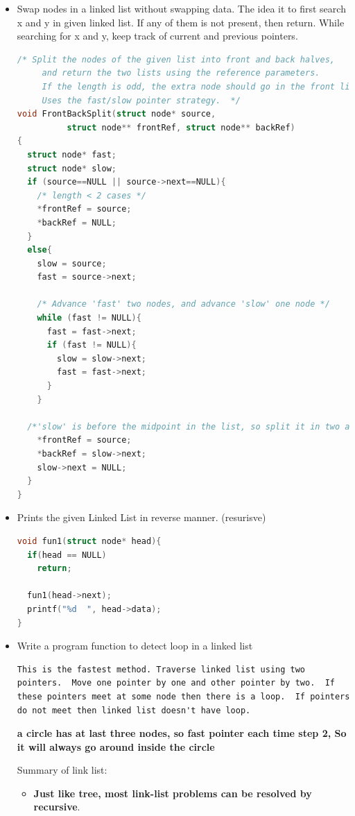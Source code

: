 \documentclass[a4paper,11pt,twoside]{book}
\begin{document}
\begin{itemize}
	\item Swap nodes in a linked list without swapping data. The idea it to first search x and y in given linked list. If any of them is not present, then return. While searching for x and y, keep track of current and previous pointers.
\begin{lstlisting}[frame=single, language=c++] 
/* Split the nodes of the given list into front and back halves,
     and return the two lists using the reference parameters.
     If the length is odd, the extra node should go in the front list.
     Uses the fast/slow pointer strategy.  */
void FrontBackSplit(struct node* source,
          struct node** frontRef, struct node** backRef)
{
  struct node* fast;
  struct node* slow;
  if (source==NULL || source->next==NULL){
    /* length < 2 cases */
    *frontRef = source;
    *backRef = NULL;
  }
  else{
    slow = source;
    fast = source->next;
 
    /* Advance 'fast' two nodes, and advance 'slow' one node */
    while (fast != NULL){
      fast = fast->next;
      if (fast != NULL){
        slow = slow->next;
        fast = fast->next;
      }
    }
 
  /*'slow' is before the midpoint in the list, so split it in two at that point.*/
    *frontRef = source;
    *backRef = slow->next;
    slow->next = NULL;
  }
}

\end{lstlisting}


	\item Prints the given Linked List in reverse manner. (resurisve)
\begin{lstlisting}[frame=single, language=c++]
void fun1(struct node* head){
  if(head == NULL)
    return;
  
  fun1(head->next);
  printf("%d  ", head->data);
}
\end{lstlisting}

	\item Write a program function to detect loop in a linked list
\begin{lstlisting}[breaklines]
This is the fastest method. Traverse linked list using two pointers.  Move one pointer by one and other pointer by two.  If these pointers meet at some node then there is a loop.  If pointers do not meet then linked list doesn't have loop.
\end{lstlisting}
\textbf{a circle has at last three nodes, so fast pointer each time step 2, So it will always go around inside the circle}

	\par Summary of link list:
\begin{itemize}
\item \textbf{Just like tree, most link-list problems can be resolved by recursive}.


\end{itemize}
\end{itemize}
\end{document}
